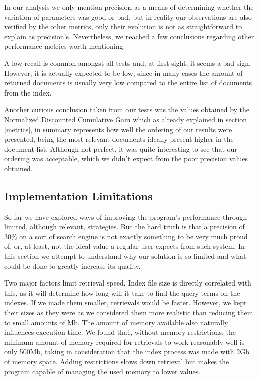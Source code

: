 \documentclass[12pt]{article}
\begin{document}
\newpage
In our analysis we only mention precision as a means of determining whether 
the variation of parameters was good or bad, but in reality our observations 
are also verified by the other metrics, only their evolution is not as 
straightforward to explain as precision's.
Nevertheless, we reached a few conclusions regarding other performance metrics
worth mentioning.

A low recall is common amongst all tests and, at first sight, it seems a bad sign.
However, it is actually expected to be low, since in many cases the amount of 
returned documents is usually very low compared to the entire list of documents 
from the index.

Another curious conclusion taken from our tests was the values obtained by the 
Normalized Discounted Cumulative Gain which as already explained in section 
\ref{metrics}, in summary represents how well the ordering of our results were 
presented, being the most relevant documents ideally present higher in the 
document list. 
Although not perfect, it was quite interesting to see that our ordering was 
acceptable, which we didn't expect from the poor precision values obtained.

\subsection{Implementation Limitations} \label{limitations}

So far we have explored ways of improving the program's performance through
limited, although relevant, strategies.
But the hard truth is that a precision of 30\% on a sort of search engine is not
exactly something to be very much proud of, or, at least, not the ideal value 
a regular user expects from such system.
In this section we attempt to understand why our solution is so limited and 
what could be done to greatly increase its quality.

Two major factors limit retrieval speed.
Index file size is directly correlated with this, as it will determine how long
will it take to find the query terms on the indexes. 
If we made them smaller, retrievals would be faster.
However, we kept their sizes as they were as we considered them more realistic 
than reducing them to small amounts of Mb.
The amount of memory available also naturally influences execution time.
We found that, without memory restrictions, the minimum amount of memory required 
for retrievals to work reasonably well is only 500Mb, taking in consideration 
that the index process was made with 2Gb of memory space.
Adding restrictions slows down retrieval but makes the program capable of managing
the used memory to lower values. 
\end{document}
